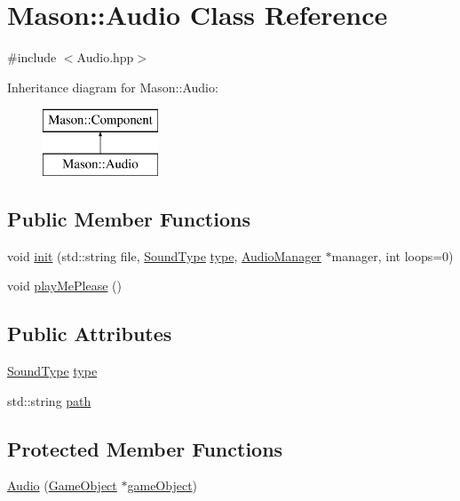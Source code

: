 \hypertarget{class_mason_1_1_audio}{}\section{Mason\+:\+:Audio Class Reference}
\label{class_mason_1_1_audio}


{\ttfamily \#include $<$Audio.\+hpp$>$}

Inheritance diagram for Mason\+:\+:Audio\+:\begin{figure}[H]
\begin{center}
\leavevmode
\includegraphics[height=2.000000cm]{class_mason_1_1_audio}
\end{center}
\end{figure}
\subsection*{Public Member Functions}
\begin{DoxyCompactItemize}
\item 
void \hyperlink{class_mason_1_1_audio_a5d4f318f5bee0b59d1a4289495b01b4c}{init} (std\+::string file, \hyperlink{namespace_mason_a158d651086d1ba1aacc4c37125b27657}{Sound\+Type} \hyperlink{class_mason_1_1_audio_a100d9da58685f865bf03dcf44a55fb63}{type}, \hyperlink{class_mason_1_1_audio_manager}{Audio\+Manager} $\ast$manager, int loops=0)
\item 
void \hyperlink{class_mason_1_1_audio_ac7d8df0800550af53c8f6f5e1299e4b3}{play\+Me\+Please} ()
\end{DoxyCompactItemize}
\subsection*{Public Attributes}
\begin{DoxyCompactItemize}
\item 
\hyperlink{namespace_mason_a158d651086d1ba1aacc4c37125b27657}{Sound\+Type} \hyperlink{class_mason_1_1_audio_a100d9da58685f865bf03dcf44a55fb63}{type}
\item 
std\+::string \hyperlink{class_mason_1_1_audio_a762cc6174ce20a011fe1e3a36e649204}{path}
\end{DoxyCompactItemize}
\subsection*{Protected Member Functions}
\begin{DoxyCompactItemize}
\item 
\hyperlink{class_mason_1_1_audio_a433e686e47efeff747a71a847e8ae83a}{Audio} (\hyperlink{class_mason_1_1_game_object}{Game\+Object} $\ast$\hyperlink{class_mason_1_1_component_a30030370c35f5562cbbbb0927b0448c8}{game\+Object})
\end{DoxyCompactItemize}
